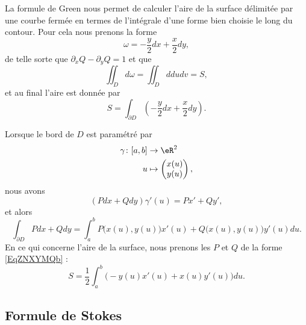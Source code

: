 La formule de Green nous permet de calculer l'aire de la surface délimitée par une courbe fermée en termes de l'intégrale d'une forme bien choisie le long du contour. Pour cela nous prenons la forme
\begin{equation}    \label{EqZNXYMQb}
    \omega=-\frac{ y }{2}dx+\frac{ x }{2}dy,
\end{equation}
de telle sorte que \( \partial_xQ-\partial_yQ=1\) et que
\begin{equation}
    \iint_Dd\omega=\iint_Dddudv=S,
\end{equation}
et au final l'aire est donnée par
\begin{equation}
    S=\int_{\partial D}\left( -\frac{ y }{2}dx+\frac{ x }{2}dy \right).
\end{equation}

Lorsque le bord de \( D\) est paramétré par
\begin{equation}
    \begin{aligned}
        \gamma\colon \mathopen[ a , b \mathclose]&\to \eR^2 \\
        u&\mapsto \begin{pmatrix}
            x(u)    \\ 
            y(u)    
        \end{pmatrix},
    \end{aligned}
\end{equation}
nous avons
\begin{equation}
    (Pdx+Qdy)\gamma'(u)=Px'+Qy',
\end{equation}
et alors
\begin{equation}
    \int_{\partial D}Pdx+Qdy=\int_a^b P\big( x(u),y(u) \big)x'(u)+Q\big( x(u),y(u) \big)y'(u)du.
\end{equation}
En ce qui concerne l'aire de la surface, nous prenons les \( P\) et \( Q\) de la forme \ref{EqZNXYMQb} :
\begin{equation}    \label{EqAJGrtOk}
    S=\frac{ 1 }{2}\int_a^b\Big( -y(u)x'(u)+x(u)y'(u) \Big)du.
\end{equation}

\subsection{Formule de Stokes}
\label{secstokesusuel}

